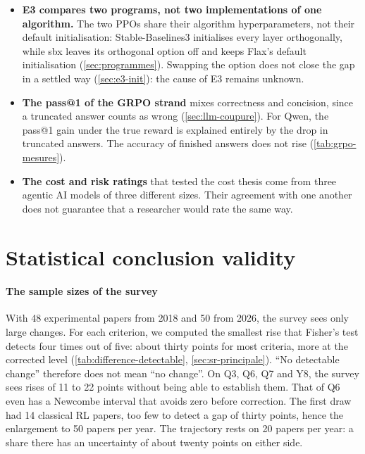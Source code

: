 \begin{itemize}
        the last step. Experiment B3 shows that another measure (best score, mean of the curve)
        changes the order of some pairs. Reporting the best point of the curve instead of the last
        inflates the interquartile mean of PPO by up to 48\% (PPO JAX on , ten random
        seeds, ).
  \item \textbf{E3 compares two programs, not two implementations of one algorithm.} The two PPOs
        share their algorithm hyperparameters, not their default initialisation: Stable-Baselines3
        initialises every layer orthogonally, while sbx leaves its orthogonal option off and keeps
        Flax's default initialisation (\cref{sec:programmes}). Swapping the option does not close the
        gap in a settled way (\cref{sec:e3-init}): the cause of E3 remains unknown.
  \item \textbf{The pass@1 of the GRPO strand} mixes correctness and concision, since a truncated
        answer counts as wrong (\cref{sec:llm-coupure}). For Qwen, the pass@1 gain under the true
        reward is explained entirely by the drop in truncated answers. The accuracy of finished
        answers does not rise (\cref{tab:grpo-mesures}).
  \item \textbf{The cost and risk ratings} that tested the cost thesis come from three agentic AI
        models of three different sizes. Their agreement with one another does not guarantee that a
        researcher would rate the same way.
\end{itemize}

\section{Statistical conclusion validity}
\label{sec:val-stat}

\paragraph{The sample sizes of the survey} With 48 experimental papers from 2018 and 50 from 2026,
the survey sees only large changes. For each criterion, we computed the smallest rise that Fisher's
test detects four times out of five: about thirty points for most criteria, more at the
corrected level (\cref{tab:difference-detectable}, \cref{sec:sr-principale}). \enquote{No detectable
change} therefore does not mean \enquote{no change}. On Q3, Q6, Q7 and Y8, the survey sees rises of
11 to 22 points without being able to establish them. That of Q6 even has a Newcombe interval that
avoids zero before correction. The first draw had 14 classical RL papers, too few to detect a gap of
thirty points, hence the enlargement to 50 papers per year. The trajectory rests on 20 papers per year: a
share there has an uncertainty of about twenty points on either side.

